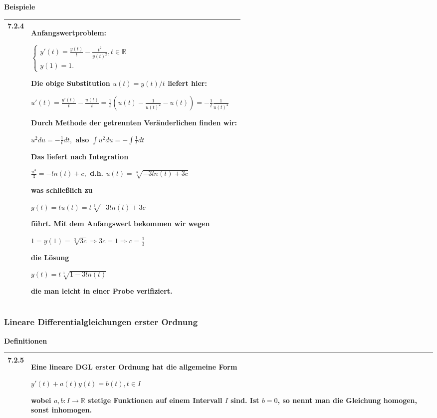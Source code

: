     \noindent
    \textbf{Beispiele}
    \begin{table}[H]
    \begin{tabularx}{\textwidth}{X m{16cm}}
        \toprule

        7.2.4 & Anfangswertproblem: \hfill \break
                \centerline{$   \begin{cases}
                                y'(t) = \frac{y(t)}{t} - \frac{t^2}{y(t)^2}, t \in \mathbb{R} \\
                                y(1) = 1. 
                                \end{cases} $} 
                Die obige Substitution $u(t) = y(t)/t$ liefert hier: \hfill \break
                \centerline{$ u'(t)= \frac{y'(t)}{t} - \frac{u(t)}{t} = \frac{1}{t} (u(t) - \frac{1}{u(t)^2}-u(t)) = - \frac{1}{t} \frac{1}{u(t)^2} $} 
                Durch Methode der getrennten Veränderlichen finden wir: \hfill \break
                \centerline{$ u^2du=-\frac{1}{t}dt,$ also $\int u^2 du= -\int \frac{1}{t}dt$} 
                Das liefert nach Integration \hfill \break
                \centerline{$ \frac{u^3}{3} = -ln(t)+c,$ d.h. $ u(t) = \sqrt[3]{-3ln(t)+3c} $}
                was schließlich zu \hfill \break
                \centerline{$ y(t) = tu(t) = t \sqrt[3]{-3ln(t) +3c} $}
                führt. Mit dem Anfangswert bekommen wir wegen \hfill \break
                \centerline{$ 1 = y(1) = \sqrt[3]{3c} \Rightarrow 3c = 1 \Rightarrow c = \frac{1}{3} $}
                die Lösung \hfill \break
                \centerline{$ y(t) = t \sqrt[3]{1-3ln(t)} $}
                die man leicht in einer Probe verifiziert. \\

        \bottomrule
    \end{tabularx}
    \end{table}
\subsubsection{Lineare Differentialgleichungen erster Ordnung}

    \noindent
    \textbf{Definitionen}
    \begin{table}[H]  
    \begin{tabularx}{\textwidth}{X m{16cm}}
        \toprule

        7.2.5 & Eine lineare DGL erster Ordnung hat die allgemeine Form \hfill \break
                \centerline{$ y'(t) + a(t) y(t) = b(t), t \in I$}
                wobei $a,b: I \rightarrow \mathbb{R}$ stetige Funktionen auf einem Intervall $I$ sind. \hfill \break
                Ist $b= 0$, so nennt man die Gleichung homogen, sonst inhomogen. \\

        \bottomrule

    \end{tabularx}
    \end{table}

